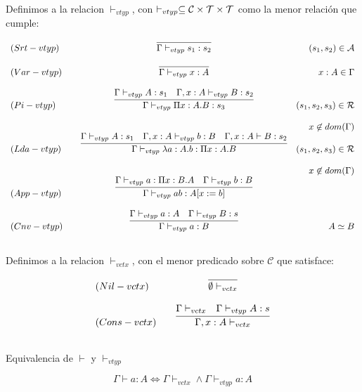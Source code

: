 \begin{definition}
Definimos a la relacion $\vdash_{vtyp}$, con $\vdash_{vtyp} \subseteq \mathcal{C}\times\mathcal{T}\times\mathcal{T}$ como
la menor relación que cumple:


\[
\begin{array}{llcr}
	(Srt-vtyp) & &\infer{\Gamma \vdash_{vtyp} s_{1} : s_{2}}{} & (s_{1},s_{2}) \in\cA \\ \\ 
	(Var-vtyp) & &\infer{\Gamma \vdash_{vtyp} x : A}{} & x:A \in\Gamma \\ \\
	(Pi-vtyp)  & &\infer{\Gamma \vdash_{vtyp} \Pi x:A.B : s_{3}}{\Gamma\vdash_{vtyp} A:s_{1} & \Gamma, x:A \vdash_{vtyp} B:s_{2}} &  (s_1,s_2,s_3)\in\cR\\ \\
               & &                                             & x \not\in dom(\Gamma)\\
	(Lda-vtyp) & &\infer{\Gamma \vdash_{vtyp} \lambda a:A.b : \Pi x:A.B }{\Gamma\vdash_{vtyp} A:s_{1} & \Gamma, x:A \vdash_{vtyp} b:B &\Gamma, x:A \vdash B:s_{2}} &  (s_1,s_2,s_3)\in\cR\\ \\
               & &                                             & x \not\in dom(\Gamma)\\
	(App-vtyp) & &\infer{\Gamma \vdash_{vtyp} a b : A[x:= b] }{\Gamma\vdash_{vtyp} a : \Pi x:B.A & \Gamma \vdash_{vtyp} b:B} &  \\ \\
	(Cnv-vtyp) & &\infer{\Gamma \vdash_{vtyp} a:B}{\Gamma\vdash_{vtyp} a:A & \Gamma\vdash_{vtyp} B:s} & A \simeq B \\ \\
	
\end{array}
\]

\end{definition}

\begin{definition}
Definimos a la relacion $\vdash_{vctx}$, con el menor predicado sobre $\mathcal{C}$ que satisface:

\[
\begin{array}{llcr}
	(Nil-vctx)  & &\infer{\emptyset \vdash_{vctx}}{} \\ \\ 
	(Cons-vctx) & &\infer{\Gamma, x:A \vdash_{vctx}}{\Gamma \vdash_{vctx} & \Gamma \vdash_{vtyp} A : s} \\ \\ 
	

	
\end{array}
\]

\begin{lemma}{Equivalencia de $\vdash$ y $\vdash_{vtyp}$}

\begin{equation}
\Gamma \vdash a : A \Leftrightarrow \Gamma \vdash_{vctx} \land \Gamma \vdash_{vtyp} a:A
\end{equation}
\end{lemma}

\end{definition}
